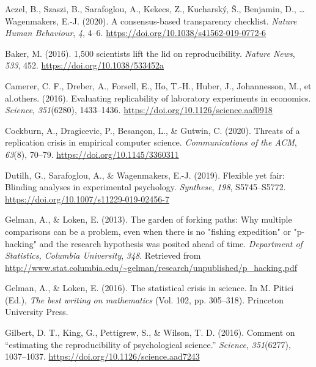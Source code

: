 \documentclass[
  english,
  man,floatsintext]{apa6}
\newlength{\cslhangindent}
\newenvironment{CSLReferences}[2] %
 {\begin{list}{}{%
  \setlength{\itemindent}{0pt}
  \setlength{\leftmargin}{0pt}
  \setlength{\parsep}{0pt}
  \ifodd #1
   \setlength{\leftmargin}{\cslhangindent}
   \setlength{\itemindent}{-1\cslhangindent}
  \fi
  \setlength{\itemsep}{#2\baselineskip}}}
 {\end{list}}
\begin{document}
\protect{}\label{refs}
\begin{CSLReferences}{1}{0}
Aczel, B., Szaszi, B., Sarafoglou, A., Kekecs, Z., Kucharský, Š., Benjamin, D., \ldots{} Wagenmakers, E.-J. (2020). A consensus-based transparency checklist. \emph{Nature Human Behaviour}, \emph{4}, 4--6. \url{https://doi.org/10.1038/s41562-019-0772-6}

Baker, M. (2016). 1,500 scientists lift the lid on reproducibility. \emph{Nature News}, \emph{533}, 452. \url{https://doi.org/10.1038/533452a}

{Camerer, C. F., Dreber, A., Forsell, E., Ho, T.-H., Huber, J., Johannesson, M., et al.others}. (2016). Evaluating replicability of laboratory experiments in economics. \emph{Science}, \emph{351}(6280), 1433--1436. \url{https://doi.org/10.1126/science.aaf0918}

Cockburn, A., Dragicevic, P., Besançon, L., \& Gutwin, C. (2020). Threats of a replication crisis in empirical computer science. \emph{Communications of the ACM}, \emph{63}(8), 70--79. \url{https://doi.org/10.1145/3360311}

Dutilh, G., Sarafoglou, A., \& Wagenmakers, E.-J. (2019). Flexible yet fair: {B}linding analyses in experimental psychology. \emph{Synthese}, \emph{198}, S5745--S5772. \url{https://doi.org/10.1007/s11229-019-02456-7}

Gelman, A., \& Loken, E. (2013). The garden of forking paths: {W}hy multiple comparisons can be a problem, even when there is no "fishing expedition" or "p-hacking" and the research hypothesis was posited ahead of time. \emph{Department of Statistics, Columbia University}, \emph{348}. Retrieved from \url{http://www.stat.columbia.edu/~gelman/research/unpublished/p_hacking.pdf}

Gelman, A., \& Loken, E. (2016). The statistical crisis in science. In M. Pitici (Ed.), \emph{The best writing on mathematics} (Vol. 102, pp. 305--318). Princeton University Press.

Gilbert, D. T., King, G., Pettigrew, S., \& Wilson, T. D. (2016). Comment on {``estimating the reproducibility of psychological science.''} \emph{Science}, \emph{351}(6277), 1037--1037. \url{https://doi.org/10.1126/science.aad7243}


\end{CSLReferences}
\end{document}
